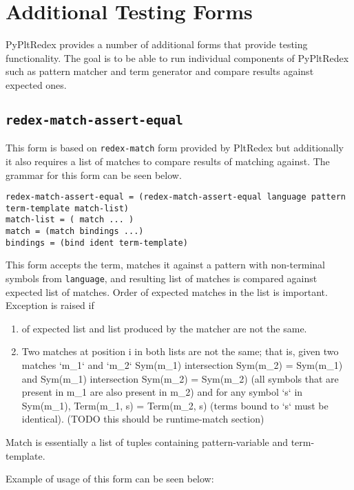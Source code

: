 \section{Additional Testing Forms}

PyPltRedex provides a number of additional forms that provide testing functionality. The goal is to be able to run individual components of PyPltRedex such as pattern matcher and term generator and compare results against expected ones. 

\subsection{ \texttt{redex-match-assert-equal} }

This form is based on \texttt{redex-match} form provided by PltRedex but additionally it also requires a list of matches to compare results of matching against. The grammar for this form can be seen below.

\begin{lstlisting}
redex-match-assert-equal = (redex-match-assert-equal language pattern term-template match-list)
match-list = ( match ... )
match = (match bindings ...)
bindings = (bind ident term-template)
\end{lstlisting}

This form accepts the term, matches it against a pattern with non-terminal symbols from \texttt{language}, and resulting list of matches is compared against expected list of matches. Order of expected matches in the list is important. Exception is raised if 

\begin{enumerate}
\item
of expected list and list produced by the matcher are not the same.
\item
 Two matches at position i in both lists are not the same; that is, given two matches `m\_1` and `m\_2` Sym(m\_1) intersection Sym(m\_2) = Sym(m\_1) and Sym(m\_1) intersection Sym(m\_2) = Sym(m\_2) (all symbols that are present in m\_1 are also present in m\_2) and for any symbol `s` in Sym(m\_1), Term(m\_1, s) = Term(m\_2, s) (terms bound to `s` must be identical). (TODO this should be runtime-match section)
\end{enumerate}

Match is essentially a list of tuples containing pattern-variable and term-template. 

Example of usage of this form can be seen below: 

